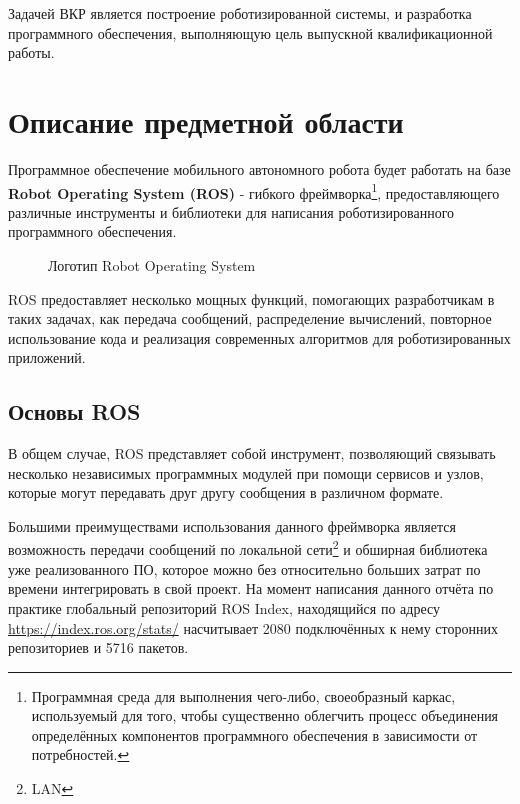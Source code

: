 \documentclass[12pt,a4paper]{scrartcl}
\begin{document}
			Задачей ВКР является построение роботизированной системы, и разработка программного обеспечения, выполняющую цель выпускной квалификационной работы.
			
		\section{Описание предметной области} \label{sec:Description}
			Программное обеспечение мобильного автономного робота будет работать на базе \textbf{Robot Operating System (ROS)} - гибкого фреймворка\footnote{Программная среда для выполнения чего-либо, своеобразный каркас, используемый для того, чтобы существенно облегчить процесс объединения определённых компонентов программного обеспечения в зависимости от потребностей\cite{bib:FrameworkDefinition}.}, предоставляющего различные инструменты и библиотеки для написания роботизированного программного обеспечения. 
			
			\begin{figure}[h]
				\caption{Логотип Robot Operating System}
				\label{fig:ROSLogo}
			\end{figure}
			
			ROS предоставляет несколько мощных функций, помогающих разработчикам в таких задачах, как передача сообщений, распределение вычислений, повторное использование кода и реализация современных алгоритмов для роботизированных приложений\cite{bib:ROSDefinition}.
			
			\subsection{Основы ROS}
				В общем случае, ROS представляет собой инструмент, позволяющий связывать несколько независимых программных модулей при помощи сервисов и узлов, которые могут передавать друг другу сообщения в различном формате.
				
				Большими преимуществами использования данного фреймворка является возможность передачи сообщений по локальной сети\footnote{LAN} и обширная библиотека уже реализованного ПО, которое можно без относительно больших затрат по времени интегрировать в свой проект. На момент написания данного отчёта по практике глобальный репозиторий ROS Index, находящийся по адресу \href{https://index.ros.org/stats/}{https://index.ros.org/stats/} насчитывает 2080 подключённых к нему сторонних репозиториев и 5716 пакетов.
				
\end{document}
